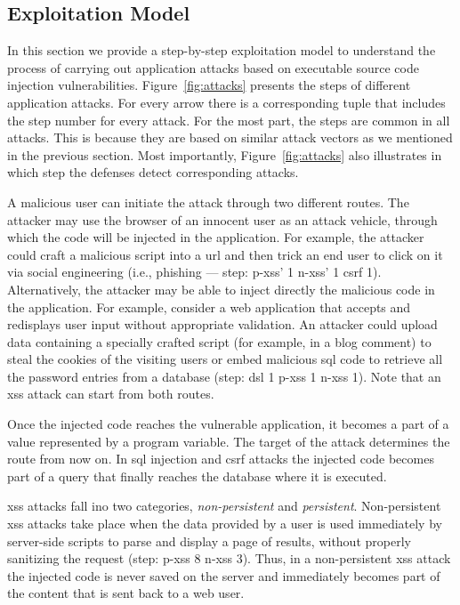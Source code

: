 \documentclass[conference]{IEEEtran}
\begin{document}

\subsection{Exploitation Model}
\label{sec:model}

In this section we provide a step-by-step exploitation model to
understand the process of carrying out application attacks based on
executable source code injection vulnerabilities.
Figure~\ref{fig:attacks} presents the steps of different application
attacks. For every arrow there is a
corresponding tuple that includes the step number for
every attack. For the most part, the steps are common in all attacks. This
is because they are based on similar attack vectors as we mentioned in
the previous section. Most importantly,
Figure~\ref{fig:attacks} also illustrates in which step
the defenses detect corresponding attacks.

A malicious user can initiate the attack through two different routes.
The attacker may use the browser of an innocent user as an attack
vehicle, through which the code will be injected in the application.
For example, the attacker could craft a malicious script into a {\sc url}
and then trick an end user to click on it via social engineering (i.e., phishing ---
{\sc step}: {\sc p-xss}' 1 \text{\textbar} {\sc n-xss}' 1 \text{\textbar} {\sc csrf} 1).
Alternatively, the attacker may be able to inject
directly the malicious code in the application. For example, consider
a web application that accepts and redisplays user input
without appropriate validation. An attacker could
upload data containing a specially crafted script (for example, in a
blog comment) to steal the cookies of the visiting users or embed
malicious {\sc sql} code to retrieve all the password entries from a
database ({\sc step}: {\sc dsl} 1 \text{\textbar}
{\sc p-xss} 1 \text{\textbar} {\sc n-xss} 1).
Note that an {\sc xss} attack can start from both routes.

Once the injected code reaches the vulnerable application, it becomes
a part of a value represented by a program variable. The target of the
attack determines the route from now on. In {\sc sql} injection and
{\sc csrf} attacks the injected code becomes part of a query that
finally reaches the database where it is executed. 

{\sc xss} attacks fall ino two categories, {\it non-persistent} and
{\it persistent}. Non-persistent {\sc xss} attacks take place when the
data provided by a user is used immediately by server-side scripts to
parse and display a page of results, without properly sanitizing the
request ({\sc step}: {\sc p-xss} 8 \text{\textbar} {\sc n-xss} 3).
Thus, in a non-persistent {\sc xss} attack the injected code
is never saved on the server and immediately becomes part of the
content that is sent back to a web user.
\end{document}
